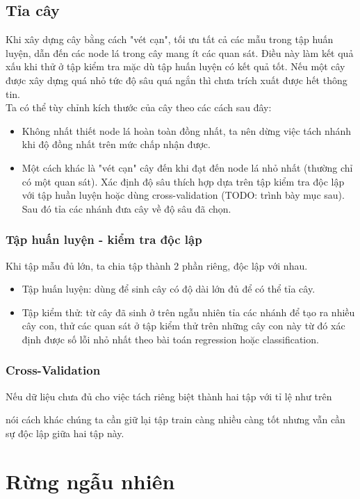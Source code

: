 \subsection{Tỉa cây}
Khi xây dựng cây bằng cách "vét cạn", tối ưu tất cả các mẫu trong tập huấn luyện, dẫn đến các node lá trong cây mang ít các quan sát. Điều này làm kết quả xấu khi thử ở tập kiểm tra mặc dù tập huấn luyện có kết quả tốt. Nếu một cây được xây dựng quá nhỏ tức độ sâu quá ngắn thì chưa trích xuất được hết thông tin.\\
Ta có thể tùy chỉnh kích thước của cây theo các cách sau đây:
\begin{itemize}
\item Không nhất thiết node lá hoàn toàn đồng nhất, ta nên dừng việc tách nhánh khi độ đồng nhất trên mức chấp nhận được.
\item Một cách khác là "vét cạn" cây đến khi đạt đến node lá nhỏ nhất (thường chỉ có một quan sát). Xác định độ sâu thích hợp dựa trên tập kiểm tra độc lập với tập huần luyện  hoặc dùng cross-validation (TODO: trình bày mục sau). Sau đó tỉa các nhánh đưa cây về độ sâu đã chọn.
\end{itemize}


\subsubsection{Tập huấn luyện - kiểm tra độc lập}
Khi tập mẫu đủ lớn, ta chia tập thành 2 phần riêng, độc lập với nhau.
\begin{itemize}
\item Tập huấn luyện: dùng để sinh cây có độ dài lớn đủ để có thể tỉa cây.
\item Tập kiểm thử: từ cây đã sinh ở trên ngẫu nhiên tỉa các nhánh để tạo ra nhiều cây con, thử các quan sát ở tập kiểm thử trên những cây con này từ đó xác định được số lỗi nhỏ nhất theo bài toán regression hoặc classification.
\end{itemize}
\subsubsection{Cross-Validation}
Nếu dữ liệu chưa đủ cho việc tách riêng biệt thành hai tập với tỉ lệ như trên 

 nói cách khác chúng ta cần giữ lại tập train càng nhiều càng tốt nhưng vẫn cần sự độc lập giữa hai tập này.
\section{Rừng ngẫu nhiên}